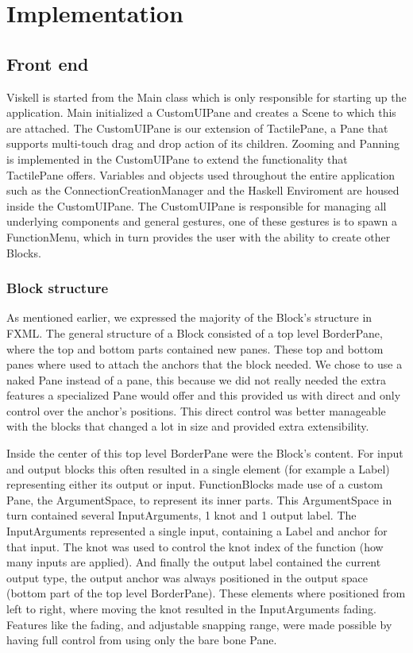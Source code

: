 \chapter{Implementation}
\label{chap:implementation}

\section{Front end}
Viskell is started from the Main class which is only responsible for starting up the application. Main initialized a CustomUIPane and creates a Scene to which this are attached. The CustomUIPane is our extension of TactilePane, a Pane that supports multi-touch drag and drop action of its children. Zooming and Panning is implemented in the CustomUIPane to extend the functionality that TactilePane offers. Variables and objects used throughout the entire application such as the ConnectionCreationManager and the Haskell Enviroment are housed inside the CustomUIPane. The CustomUIPane is responsible for managing all underlying components and general gestures, one of these gestures is to spawn a FunctionMenu, which in turn provides the user with the ability to create other Blocks.

\subsection{Block structure}
As mentioned earlier, we expressed the majority of the Block's structure in FXML. The general structure of a Block consisted of a top level BorderPane, where the top and bottom parts contained new panes. These top and bottom panes where used to attach the anchors that the block needed. We chose to use a naked Pane instead of a pane, this because we did not really needed the extra features a specialized Pane would offer and this provided us with direct and only control over the anchor's positions. This direct control was better manageable with the blocks that changed a lot in size and provided extra extensibility.

Inside the center of this top level BorderPane were the Block's content. For input and output blocks this often resulted in a single element (for example a Label) representing either its output or input. FunctionBlocks made use of a custom Pane, the ArgumentSpace, to represent its inner parts. This ArgumentSpace in turn contained several InputArguments, 1 knot and 1 output label. The InputArguments represented a single input, containing a Label and anchor for that input. The knot was used to control the knot index of the function (how many inputs are applied). And finally the output label contained the current output type, the output anchor was always positioned in the output space (bottom part of the top level BorderPane). These elements where positioned from left to right, where moving the knot resulted in the InputArguments fading. Features like the fading, and adjustable snapping range, were made possible by having full control from using only the bare bone Pane.

